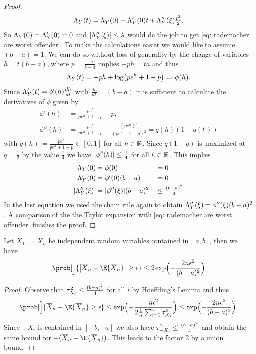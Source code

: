 \begin{proof}
    \[
        \Lambda_Y(t) = \Lambda_Y(0) + \Lambda_Y'(0)t + \Lambda_Y''(\xi)\tfrac{t^2}{2}.
    \]
    So \(\Lambda_Y(0) = \Lambda_Y'(0)=0\) and \(\lvert\Lambda_Y''(\xi)\rvert \le \lambda\)
    would do the job to get \eqref{eq: rademacher are worst offender}. To
    make the calculations easier we would like to assume \((b-a)=1\).
    We can do so without loss of generality by the change of variables
    \(h=t(b-a)\), where \(p= \frac{-a}{b-a}\) implies \(-ph= ta\)
    and thus
    \[
        \Lambda_Y(t)
        = -ph +  \log\bigl(p e^{h} + 1-p\bigr) \eqcolon \phi(h).
    \]
    Since \(\Lambda_Y'(t) = \phi'(h) \frac{dh}{dt}\) with \(\frac{dh}{dt} =
    (b-a)\) it is sufficient to calculate the derivatives of \(\phi\) given by 
    \begin{align*}
        \phi'(h) &= \frac{pe^h}{pe^h +1-p} -p,
        \\
        \phi''(h) &= \frac{pe^h}{pe^h +1-p} - \frac{(pe^h)^2}{(pe^h +1-p)^2} = q(h)(1-q(h))
    \end{align*}
    with \(q(h) \coloneqq \frac{pe^h}{pe^h +1-p}\in [0,1]\) for all \(h\in \mathbb{R}\). Since \(q(1-q)\) is maximized at
    \(q=\frac12\) by the value \(\frac14\) we have \(\lvert\phi''(h)\rvert \le \frac14\) for all \(h\in \mathbb{R}\).
    This implies
    \begin{alignat*}{2}
        \Lambda_Y(0) &= \phi(0) &&= 0
        \\
        \Lambda_Y'(0) &= \phi'(0)(b-a) &&= 0
        \\
        \lvert\Lambda_Y''(\xi)\rvert &= \lvert\phi''(\xi)\rvert(b-a)^2 &&\le \tfrac{(b-a)^2}4
    \end{alignat*}
    In the last equation we used the chain rule again to obtain \(\Lambda_Y''(\xi) = \phi''(\xi)(b-a)^2\). 
    A comparison of the the Taylor expansion with \eqref{eq: rademacher are worst
    offender} finishes the proof.
\end{proof}

\begin{mdframed}[innertopmargin=0pt]
\begin{corollary}
    \label{cor: hoeffding inequality for bounded random variables}
    Let \(X_1, \ldots, X_n\) be independent random variables contained in
    \([a,b]\), then we have
    \[
        \prob[\Big]{\abs[\big]{\mean{X}_n - \E{\mean{X}_n}} \ge \epsilon}
        \le 2 \exp\Bigl(-\frac{2n\epsilon^2}{(b-a)^2}\Bigr)
    \]
\end{corollary}
\end{mdframed}
\begin{proof}
    Observe that \(\tau^2_{X_i} \le \frac{(b-a)^2}4\) for all \(i\) by Hoeffding's Lemma and thus
    \[
        \prob[\Big]{\mean{X}_n - \E{\mean{X}_n} \ge \epsilon}
        \le \exp\Bigl(-\frac{n \epsilon^2}{2\frac1n\sum_{i=1}^n \varProx{X_i}}\Bigr)
        \le \exp\Bigl(-\frac{2n\epsilon^2}{(b-a)^2}\Bigr).
    \]
    Since \(-X_i\) is contained in \([-b, -a]\) we also have \(\tau^2_{-X_i} \le \frac{(b-a)^2}4\)
    and obtain the same bound for \(-(\mean{X}_n - \E{\mean{X}_n})\). This leads
    to the factor \(2\) by a union bound.
\end{proof}

